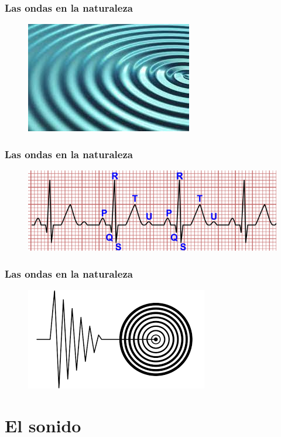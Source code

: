 \documentclass[14pt]{beamer}
\begin{document}
\begin{frame}
\frametitle{Las ondas en la naturaleza}
\begin{figure}
    \centering
    \includegraphics[scale=0.9]{Imagenes/Ondas_01.jpg}
\end{figure}
\end{frame}
\begin{frame}
\frametitle{Las ondas en la naturaleza}
\begin{figure}
    \centering
    \includegraphics[scale=0.5]{Imagenes/Ondas_02.png}
\end{figure}
\end{frame}
\begin{frame}
\frametitle{Las ondas en la naturaleza}
\begin{figure}
    \centering
    \includegraphics[scale=0.6]{Imagenes/Ondas_03.png}
\end{figure}
\end{frame}

\section{El sonido}
\end{document}
